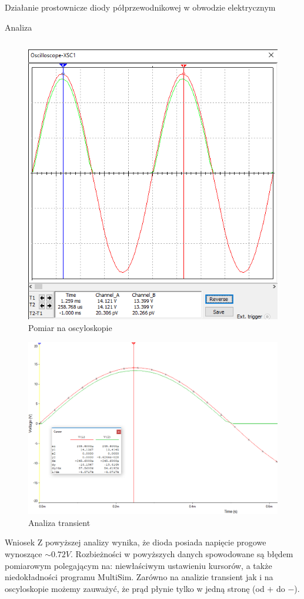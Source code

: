 \documentclass[a4paper]{scrartcl}
\begin{document}
\begin{section}{Działanie prostownicze diody półprzewodnikowej w obwodzie elektrycznym}
\begin{subsection}{Analiza}
\begin{table}[ht]
\begin{tabular}{| >{\bfseries}p{3.5cm} | l | l |}
					\end{tabular}
				\end{table}

				\begin{figure}[h]
				\begin{center}
					\includegraphics[width=0.6\linewidth]{exercise-1-osciloscope}
					\caption{Pomiar na oscyloskopie}
					\label{fig:circuit-1-osc}
				\end{center}
				\end{figure}

				\begin{figure}[!ht]
				\begin{center}
					\includegraphics[width=0.7\linewidth,scale=2]{exercise-1-transient}
					\caption{Analiza transient}
					\label{fig:circuit-1-transient}
				\end{center}
				\end{figure}
		\end{subsection}
		\begin{subsection}{Wniosek}
			Z powyższej analizy wynika, że dioda posiada napięcie progowe wynoszące $\sim0.72 V $. Rozbieżności w powyższych danych spowodowane są błędem pomiarowym polegającym na: niewłaściwym ustawieniu kursorów, a także niedokładności programu MultiSim. Zarówno na analizie transient jak i na oscyloskopie możemy zauważyć, że prąd płynie tylko w jedną stronę (od $+$ do $-$).
		\end{subsection}
	\end{section}
\end{document}
